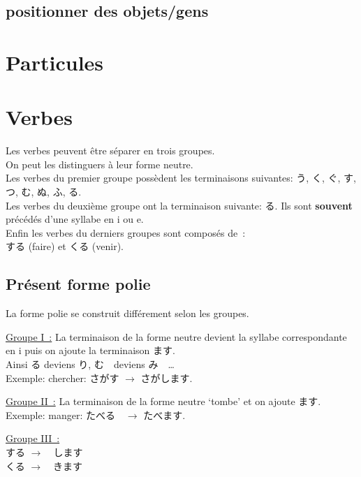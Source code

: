 \documentclass{article}
\begin{document}
    \subsection{positionner des objets/gens}


\section{Particules}


\section{Verbes}
\begin{CJK}{UTF8}{min}
    Les verbes peuvent être séparer en trois groupes.\\
    On peut les distinguers à leur forme neutre.\\
    Les verbes du premier groupe possèdent les terminaisons suivantes:
    う, く, ぐ, す, つ, む, ぬ, ふ, る.\\
    Les verbes du deuxième groupe ont la terminaison suivante:
    る. Ils sont \textbf{souvent} précédés d'une syllabe en i ou e.\\
    Enfin les verbes du derniers groupes sont composés de~:\\
    する (faire) et くる (venir).
    
    \subsection{Présent forme polie}
    La forme polie se construit différement selon les groupes.\\
    \par
    \underline{Groupe I~:}
        La terminaison de la forme neutre devient la syllabe correspondante en i puis on ajoute la terminaison ます.\\
        Ainsi る deviens り, む　deviens み　\ldots\\
        Exemple: chercher: さがす $\rightarrow$ さがします.\\
    \par
    \underline{Groupe II~:}
        La terminaison de la forme neutre `tombe' et on ajoute ます.
        Exemple: manger: たべる　$\rightarrow$ たべます.
    \par

    \underline{Groupe III~:} \\
        する $\rightarrow$　します\\
        くる $\rightarrow$　きます

\end{CJK}
\end{document}
